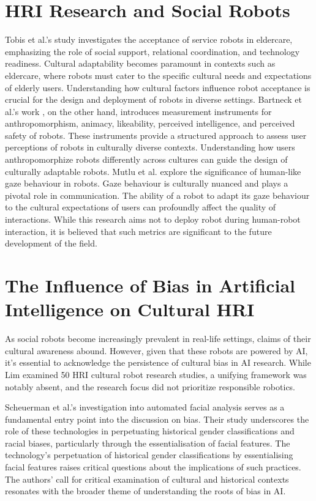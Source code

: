 \section{HRI Research and Social Robots}
Tobis et al.'s study \cite{tobis2022} investigates the acceptance of service robots in eldercare, emphasizing the role of social support, relational coordination, and technology readiness. Cultural adaptability becomes paramount in contexts such as eldercare, where robots must cater to the specific cultural needs and expectations of elderly users. Understanding how cultural factors influence robot acceptance is crucial for the design and deployment of robots in diverse settings. Bartneck et al.'s work \cite{bartneck2008}, on the other hand, introduces measurement instruments for anthropomorphism, animacy, likeability, perceived intelligence, and perceived safety of robots. These instruments provide a structured approach to assess user perceptions of robots in culturally diverse contexts. Understanding how users anthropomorphize robots differently across cultures can guide the design of culturally adaptable robots. Mutlu et al. \cite{mutlu2006} explore the significance of human-like gaze behaviour in robots. Gaze behaviour is culturally nuanced and plays a pivotal role in communication. The ability of a robot to adapt its gaze behaviour to the cultural expectations of users can profoundly affect the quality of interactions. While this research aims not to deploy robot during human-robot interaction, it is believed that such metrics are significant to the future development of the field.

\section{The Influence of Bias in Artificial Intelligence on Cultural HRI}
As social robots become increasingly prevalent in real-life settings, claims of their cultural awareness abound. However, given that these robots are powered by AI, it's essential to acknowledge the persistence of cultural bias in AI research. While Lim \cite{lim2020} examined 50 HRI cultural robot research studies, a unifying framework was notably absent, and the research focus did not prioritize responsible robotics.

Scheuerman et al.'s \cite{scheuerman2021} investigation into automated facial analysis serves as a fundamental entry point into the discussion on bias. Their study underscores the role of these technologies in perpetuating historical gender classifications and racial biases, particularly through the essentialisation of facial features. The technology's perpetuation of historical gender classifications by essentialising facial features raises critical questions about the implications of such practices. The authors’ call for critical examination of cultural and historical contexts resonates with the broader theme of understanding the roots of bias in AI.

